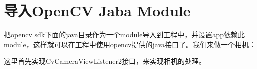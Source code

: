 \documentclass[12pt]{article}
\begin{document}
\section{导入OpenCV Jaba Module}\label{ux5bfcux5165opencv-jaba-module}

把opencv sdk下面的java目录作为一个module导入到工程中，并设置app依赖此module，这样就可以在工程中使用opencv提供的java接口了。我们来做一个相机：

\begin{Shaded}
\begin{Highlighting}[]
 
\end{Highlighting}
\end{Shaded}

这里首先实现CvCameraViewListener2接口，来实现相机的处理。
\end{document}
